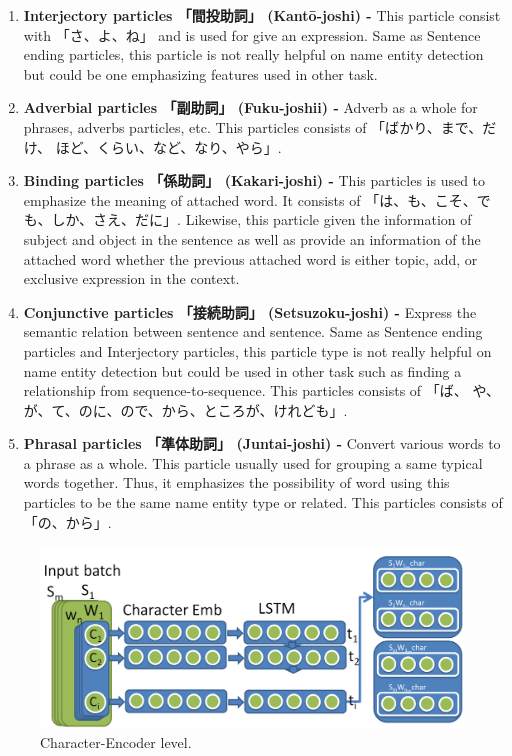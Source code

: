 \begin{CJK*}{UTF8}{min}
\begin{enumerate}
    \item \textbf{Interjectory particles 「間投助詞」 (Kantō-joshi) -}
     This particle consist with 「さ、よ、ね」 and is used for give an expression.
     Same as Sentence ending particles, this particle is not really helpful on name entity detection but could be one emphasizing features used in other task.
     
    \item \textbf{Adverbial particles 「副助詞」 (Fuku-joshii) -}
    Adverb as a whole for phrases, adverbs particles, etc.
    This particles consists of 「ばかり、まで、だけ、 ほど、くらい、など、なり、やら」.


    \item \textbf{Binding particles 「係助詞」 (Kakari-joshi) -}
    This particles is used to emphasize the meaning of attached word.
    It consists of 「は、も、こそ、で も、しか、さえ、だに」.
    Likewise, this particle given the information of subject and object in the sentence as well as provide an information of the attached word whether the previous attached word is either topic, add, or exclusive expression in the context.

    
    \item \textbf{Conjunctive particles 「接続助詞」 (Setsuzoku-joshi) -}
    Express the semantic relation between sentence and sentence.
    Same as Sentence ending particles and Interjectory particles, this particle type is not really helpful on name entity detection but could be used in other task such as finding a relationship from sequence-to-sequence.
    This particles consists of 「ば、 や、が、て、のに、ので、から、ところが、けれども」.
    
    \item \textbf{Phrasal particles 「準体助詞」 (Juntai-joshi) -}
    Convert various words to a phrase as a whole.
    This particle usually used for grouping a same typical words together.
    Thus, it emphasizes the possibility of word using this particles to be the same name entity type or related.
    This particles consists of 「の、から」.

\end{enumerate}

\begin{figure}[!h]
\centering
  \includegraphics[scale=0.3]{character_encoder.png}
  \caption{Character-Encoder level.}
  \label{fig:chaenc}
\end{figure}


\end{CJK*}

